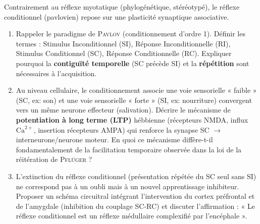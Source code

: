 \documentclass[11pt]{article}
\begin{document}
\begin{exercice}
Contrairement au réflexe myotatique (phylogénétique, stéréotypé), le réflexe conditionnel (pavlovien) repose sur une plasticité synaptique associative.
\begin{enumerate}
    \item Rappeler le paradigme de \textsc{Pavlov} (conditionnement d'ordre 1). Définir les termes : Stimulus Inconditionnel (SI), Réponse Inconditionnelle (RI), Stimulus Conditionnel (SC), Réponse Conditionnelle (RC). Expliquer pourquoi la \textbf{contiguïté temporelle} (SC précède SI) et la \textbf{répétition} sont nécessaires à l'acquisition.
    \item Au niveau cellulaire, le conditionnement associe une voie sensorielle « faible » (SC, ex: son) et une voie sensorielle « forte » (SI, ex: nourriture) convergent vers un même neurone effecteur (salivation). Décrire le mécanisme de \textbf{potentiation à long terme (LTP)} hébbienne (récepteurs NMDA, influx $\text{Ca}^{2+}$, insertion récepteurs AMPA) qui renforce la synapse SC $\to$ interneurone/neurone moteur. En quoi ce mécanisme diffère-t-il fondamentalement de la facilitation temporaire observée dans la loi de la réitération de \textsc{Pflüger} ?
    \item L'extinction du réflexe conditionnel (présentation répétée du SC seul sans SI) ne correspond pas à un oubli mais à un nouvel apprentissage inhibiteur. Proposer un schéma circuitral intégrant l'intervention du cortex préfrontal et de l'amygdale (inhibition du couplage SC-RC) et discuter l'affirmation : « Le réflexe conditionnel est un réflexe médullaire complexifié par l'encéphale ».
\end{enumerate}
\end{exercice}
\end{document}
